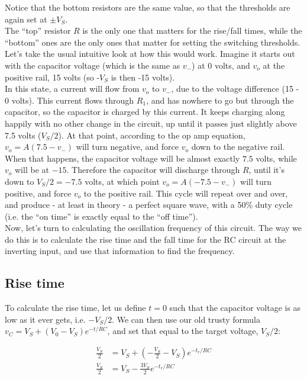 Notice that the bottom resistors are the same value, so that the thresholds are again set at $\pm V_S$.\\
The ``top'' resistor $R$ is the only one that matters for the rise/fall times, while the ``bottom'' ones are the only ones that matter for setting the switching thresholds.\\

Let's take the usual intuitive look at how this would work. Imagine it starts out with the capacitor voltage (which is the same as $v_-$) at 0 volts, and $v_o$ at the positive rail, 15 volts (so -$V_S$ is then -15 volts).\\
In this state, a current will flow from $v_o$ to $v_-$, due to the voltage difference (15 - 0 volts). This current flows through $R_1$, and has nowhere to go but through the capacitor, so the capacitor is charged by this current. It keeps charging along happily with no other change in the circuit, up until it passes just slightly above 7.5 volts ($V_S/2$). At that point, according to the op amp equation, $v_o = A(7.5 - v_-)$ will turn negative, and force $v_o$ down to the negative rail.\\
When that happens, the capacitor voltage will be almost exactly $7.5$ volts, while $v_o$ will be at $-15$. Therefore the capacitor will discharge through $R$, until it's down to $V_S/2 = -7.5$ volts, at which point $v_o = A(-7.5 - v_-)$ will turn positive, and force $v_o$ to the positive rail. This cycle will repeat over and over, and produce - at least in theory - a perfect square wave, with a 50\% duty cycle (i.e. the ``on time'' is exactly equal to the ``off time'').\\

Now, let's turn to calculating the oscillation frequency of this circuit. The way we do this is to calculate the rise time and the fall time for the RC circuit at the inverting input, and use that information to find the frequency.

\subsection{Rise time}
To calculate the rise time, let us define $t = 0$ such that the capacitor voltage is as low as it ever gets, i.e. $-V_S/2$. We can then use our old trusty formula $v_C = V_S + (V_0 - V_S)e^{-t/RC}$, and set that equal to the target voltage, $V_S/2$:

\begin{align*} 
\frac{V_S}{2} &= V_S + (-\frac{V_S}{2} - V_S) e^{-t_r/RC}\\
\frac{V_S}{2} &= V_S - \frac{3V_S}{2} e^{-t_r/RC}
\end{align*}

